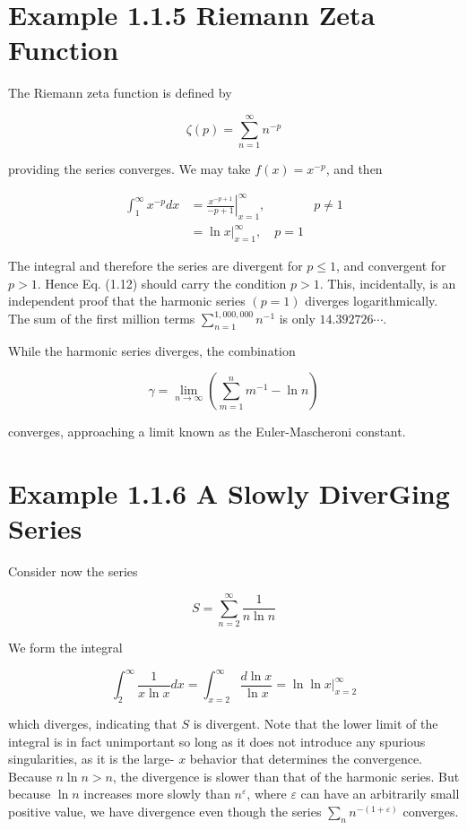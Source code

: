 \documentclass[10pt]{article}
\begin{document}
\section*{Example 1.1.5 Riemann Zeta Function}
The Riemann zeta function is defined by


\begin{equation*}
\zeta(p)=\sum_{n=1}^{\infty} n^{-p} \tag{1.12}
\end{equation*}


providing the series converges. We may take $f(x)=x^{-p}$, and then

$$
\begin{array}{rlr}
\int_{1}^{\infty} x^{-p} d x & =\left.\frac{x^{-p+1}}{-p+1}\right|_{x=1} ^{\infty}, & p \neq 1 \\
& =\left.\ln x\right|_{x=1} ^{\infty}, \quad p=1
\end{array}
$$

The integral and therefore the series are divergent for $p \leq 1$, and convergent for $p>1$. Hence Eq. (1.12) should carry the condition $p>1$. This, incidentally, is an independent proof that the harmonic series $(p=1)$ diverges logarithmically. The sum of the first million terms $\sum_{n=1}^{1,000,000} n^{-1}$ is only $14.392726 \cdots$.

While the harmonic series diverges, the combination


\begin{equation*}
\gamma=\lim _{n \rightarrow \infty}\left(\sum_{m=1}^{n} m^{-1}-\ln n\right) \tag{1.13}
\end{equation*}


converges, approaching a limit known as the Euler-Mascheroni constant.

\section*{Example 1.1.6 A Slowly DiverGing Series}
Consider now the series

$$
S=\sum_{n=2}^{\infty} \frac{1}{n \ln n}
$$

We form the integral

$$
\int_{2}^{\infty} \frac{1}{x \ln x} d x=\int_{x=2}^{\infty} \frac{d \ln x}{\ln x}=\left.\ln \ln x\right|_{x=2} ^{\infty}
$$

which diverges, indicating that $S$ is divergent. Note that the lower limit of the integral is in fact unimportant so long as it does not introduce any spurious singularities, as it is the large- $x$ behavior that determines the convergence. Because $n \ln n>n$, the divergence is slower than that of the harmonic series. But because $\ln n$ increases more slowly than $n^{\varepsilon}$, where $\varepsilon$ can have an arbitrarily small positive value, we have divergence even though the series $\sum_{n} n^{-(1+\varepsilon)}$ converges.
\end{document}
